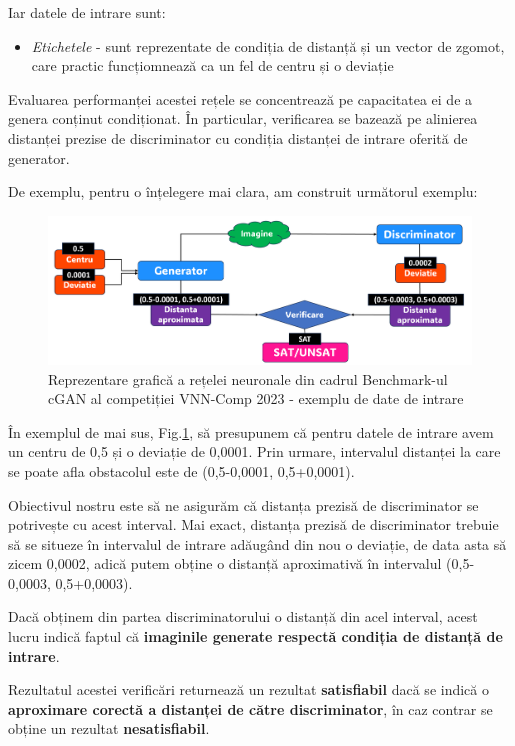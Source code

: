 Iar datele de intrare sunt:

\begin{itemize}
  \item \textit{Etichetele} -  sunt reprezentate de condiția de distanță și un vector de zgomot, care practic funcțiomnează ca un fel de centru și o deviație
\end{itemize}

Evaluarea performanței acestei rețele se concentrează pe capacitatea ei de a genera conținut condiționat. În particular, verificarea se bazează pe  alinierea distanței prezise de discriminator cu condiția distanței de intrare oferită de generator.

De exemplu, pentru o înțelegere mai clara, am construit următorul exemplu:


\begin{figure}[ht]
\centering
\includegraphics[width=12.5cm]{imagini/introducere/Ale_2.png}
\caption{Reprezentare grafică a rețelei neuronale din cadrul Benchmark-ul cGAN al competiției VNN-Comp 2023 - exemplu de date de intrare}
\label{reprezentare_grafica_cGAN_exemplu}
\end{figure}

În exemplul de mai sus, Fig.\ref{reprezentare_grafica_cGAN_exemplu}, să presupunem că pentru datele de intrare avem un centru de 0,5 și o deviație de 0,0001. Prin urmare, intervalul distanței la care se poate afla obstacolul este de (0,5-0,0001, 0,5+0,0001). 

Obiectivul nostru este să ne asigurăm că distanța prezisă de discriminator se potrivește cu acest interval. Mai exact, distanța prezisă de discriminator trebuie să se situeze în intervalul de intrare adăugând din nou o deviație, de data asta să zicem 0,0002, adică putem obține o distanță aproximativă în intervalul (0,5-0,0003, 0,5+0,0003).

Dacă obținem din partea discriminatorului o distanță din acel interval, acest lucru indică faptul că \textbf{imaginile generate respectă condiția de distanță de intrare}.

Rezultatul acestei verificări returnează un rezultat \textbf{satisfiabil} dacă se indică o \textbf{aproximare corectă a distanței de către discriminator}, în caz contrar se obține un rezultat \textbf{nesatisfiabil}.
\newpage